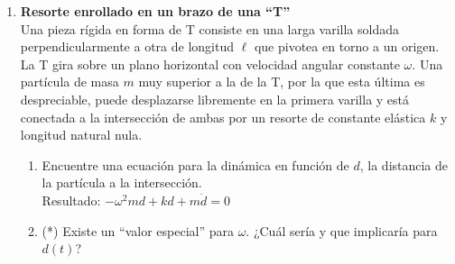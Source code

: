\documentclass[11pt, a4paper, twoside]{article}
\begin{document}
\begin{enumerate}
\item
	\begin{minipage}[t][3.9cm]{0.75\textwidth}
		\textbf{Resorte enrollado en un brazo de una ``T''}\\
		Una pieza rígida en forma de T consiste en una larga varilla soldada perpendicularmente a otra de longitud \(\ell\) que pivotea en torno a un origen.
		La T gira sobre un plano horizontal con velocidad angular constante \(\omega\).
		Una partícula de masa \(m\) muy superior a la de la T, por la que esta última es despreciable, puede desplazarse libremente en la primera varilla y está conectada a la intersección de ambas por un resorte de constante elástica \(k\) y longitud natural nula.
	\end{minipage}
	\begin{minipage}[c][1cm][t]{0.3\textwidth}
		
	\end{minipage}
	\begin{enumerate}
		\item  Encuentre una ecuación para la dinámica en función de \(d\), la distancia de la partícula a la intersección.\\
		Resultado: \(- \omega^{2} m d + k d + m \ddot{d} = 0\)
		\item (*) Existe un ``valor especial'' para \(\omega\). ¿Cuál sería y que implicaría para \(d(t)\)?
	\end{enumerate}


\end{enumerate}
\end{document}
